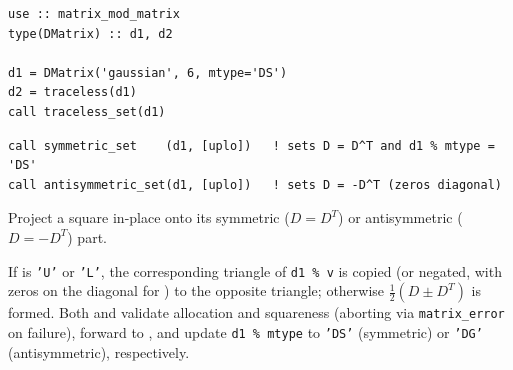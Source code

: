 \begin{description}[leftmargin=2.2cm, style=nextline]
\end{description}

\lstset{language=[95]Fortran}
\begin{lstlisting}
use :: matrix_mod_matrix
type(DMatrix) :: d1, d2

d1 = DMatrix('gaussian', 6, mtype='DS')
d2 = traceless(d1)
call traceless_set(d1)
\end{lstlisting}


\lstset{language=[95]Fortran}
\begin{lstlisting}
call symmetric_set    (d1, [uplo])   ! sets D = D^T and d1 % mtype = 'DS'
call antisymmetric_set(d1, [uplo])   ! sets D = -D^T (zeros diagonal)
\end{lstlisting}

Project a square  in-place onto its symmetric ($D = D^T$) or antisymmetric ($D = -D^T$) part.

If  is \texttt{'U'} or \texttt{'L'}, the corresponding triangle of \texttt{d1 \% v} is copied (or negated, with zeros on the diagonal for ) to the opposite triangle; otherwise $\frac{1}{2}(D \pm D^T)$ is formed. Both  and  validate allocation and squareness (aborting via \texttt{matrix\_error} on failure), forward to , and update \texttt{d1 \% mtype} to \texttt{'DS'} (symmetric) or \texttt{'DG'} (antisymmetric), respectively.

\begin{description}[leftmargin=2.2cm, style=nextline]
\end{description}

